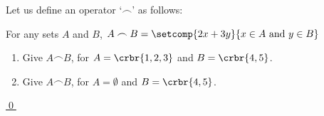 \documentclass[11pt]{article}
\begin{document}
\begin{itemize}
\begin{uexercise}\label{exfrown}
Let us define an operator `$\frown$' as follows:

For any sets $A$ and $B$, $A\frown B = \setcomp{2x + 3y}{x\in A\text{ and }y\in B}$

\begin{enumerate}
\item\label{exfrowna} Give $A\frown B$, for $A= \crbr{1,2,3}$ and $B=\crbr{4,5}$.
\item\label{exfrownb} Give $A\frown B$, for $A= \emptyset$ and $B=\crbr{4,5}$.
\end{enumerate}
\hyperlink{exfrownsol}{\qed}
\end{uexercise}

\hrulefill
\end{itemize}


\begin{comment}
\ezimeti{ 
\item Before moving on, a word on ``objects''. In this course, we will
deal with (sets of) mathematical objects. 

\item[] A mathematical object is an object that exists in the abstract world of
mathematics. Among these are symbols, numbers, functions, relations, sets, and
so on. Therefore our set of Turkish city names above is ``degenerate'' as its
elements -- the two city names -- are not mathematical objects. But don't worry,
we will see that we can easily give mathematical definitions that can take the
place of city names.
}
\end{comment}
\end{document}
